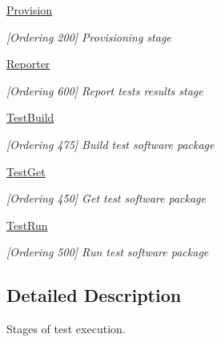 \begin{DoxyCompactItemize}
\hyperlink{group___provision}{Provision}
\begin{DoxyCompactList}\small\item\em \mbox{[}Ordering 200\mbox{]} Provisioning stage \end{DoxyCompactList}\item 
\hyperlink{group___reporter}{Reporter}
\begin{DoxyCompactList}\small\item\em \mbox{[}Ordering 600\mbox{]} Report tests results stage \end{DoxyCompactList}\item 
\hyperlink{group___test_build}{Test\-Build}
\begin{DoxyCompactList}\small\item\em \mbox{[}Ordering 475\mbox{]} Build test software package \end{DoxyCompactList}\item 
\hyperlink{group___test_get}{Test\-Get}
\begin{DoxyCompactList}\small\item\em \mbox{[}Ordering 450\mbox{]} Get test software package \end{DoxyCompactList}\item 
\hyperlink{group___test_run}{Test\-Run}
\begin{DoxyCompactList}\small\item\em \mbox{[}Ordering 500\mbox{]} Run test software package \end{DoxyCompactList}\end{DoxyCompactItemize}


\subsection{Detailed Description}
Stages of test execution. 